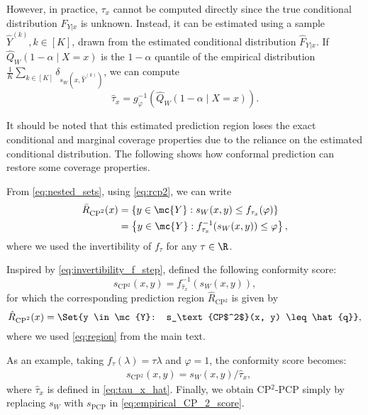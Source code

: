 However, in practice, \( \tau_x \) cannot be computed directly since the true conditional distribution \( F_{Y|x} \) is unknown. Instead, it can be estimated using a sample \( \hat{Y}^{(k)}, k \in [K] \), drawn from the estimated conditional distribution \( \hat{F}_{Y|x} \). If $\hat{Q}_W(1 - \alpha \mid X = x)$ is the \( 1 - \alpha \) quantile of the empirical distribution $\frac{1}{K} \sum_{k \in [K]} \delta_{s_W(x, \hat{Y}^{(k)})}$, we can compute
\begin{equation}
  \hat{\tau}_x = g^{-1}_\varphi(\hat{Q}_W(1 - \alpha \mid X = x)). \label{eq:tau_x_hat}
\end{equation}

It should be noted that this estimated prediction region loses the exact conditional and marginal coverage properties due to the reliance on the estimated conditional distribution. The following shows how conformal prediction can restore some coverage properties.


From \eqref{eq:nested_sets}, using \eqref{eq:rcp2}, we can write
\begin{align}
  \bar{R}_\text{CP$^2$}(x)
  &= \left\{ y \in \mc{Y}: s_W(x, y) \leq f_{\tau_x}(\varphi) \right\} \\
  &= \left\{ y \in \mc{Y}: f^{-1}_{\tau_x}(s_W(x, y)) \leq \varphi \right\}, \label{eq:invertibility_f_step}
\end{align}
where we used the invertibility of \( f_{\tau} \) for any \( \tau \in \R \).

Inspired by \eqref{eq:invertibility_f_step}, \cite{Plassier2024-ex} defined the following conformity score:
\begin{equation}
  s_\text{CP$^2$}(x, y) = f^{-1}_{\hat{\tau}_x}(s_W(x, y)), \label{eq:CP_2_score}
\end{equation}
for which the corresponding prediction region $\hat{R}_\text{CP$^2$}$ is given by
\begin{equation}
  \hat{R}_\text{CP$^2$}(x) = \Set{y \in \mc{Y}: s_\text{CP$^2$}(x, y) \leq \hat{q}},
\end{equation}
where we used \cref{eq:region} from the main text.

As an example, taking $f_\tau(\lambda) = \tau \lambda$ and $\varphi = 1$, the conformity score becomes:
\begin{align}
  &s_{\text{CP$^2$}}(x, y) = s_W(x, y) / \hat{\tau}_x
   \label{eq:empirical_CP_2_score},
\end{align}
where $\hat{\tau}_x$ is defined in \eqref{eq:tau_x_hat}. Finally, we obtain CP$^2$-PCP simply by replacing \( s_W \) with \( s_\text{PCP} \) in \eqref{eq:empirical_CP_2_score}.




